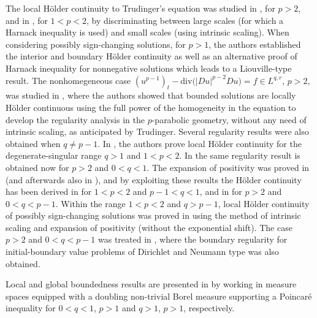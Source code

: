 \documentclass[a4paper,11pt,fullpage]{article}
\numberwithin{equation}{section}
\begin{document}
\noindent The local H\"older continuity to Trudinger's equation was studied in \cite{KuusSiljUrba10}, for $p>2$, and in \cite{KLSU}, for $1<p<2$, by discriminating between large scales (for which a Harnack inequality is used) and small scales (using intrinsic scaling). When considering possibly sign-changing solutions, for $p>1$, the authors \cite{BDL21} established the interior and boundary H\"older continuity as well as an alternative proof of Harnack inequality for nonnegative solutions which leads to a Liouville-type result. The nonhomegeneous case $\displaystyle{(u^{p-1})_t-\textrm{div} \big(|Du|^{p-2} Du\big)=f \in L^{q,r}}$, $p>2$, was studied in \cite{NU20}, where the authors showed that bounded solutions are locally H\"older continuous using the full power of the homogeneity in the equation to develop the regularity analysis in the $p$-parabolic geometry, without any need of intrinsic scaling, as anticipated by Trudinger. Several regularity results were also obtained when $q\neq p-1$. In \cite{HenrLal13}, the authors prove local H\"older continuity for the degenerate-singular range $q>1$ and $1<p<2$. In \cite{EH20} the same regularity result is obtained now for $p>2$ and $0<q<1$. The expansion of positivity was proved in \cite{EH21} (and afterwards also in \cite{M23}), and by exploiting these results the H\"older continuity has been derived in \cite{EH23} for $1<p<2$ and $p-1<q<1$, and in \cite{CH25} for $p>2$ and $0<q<p-1$. Within the range $1<p<2$ and $q>p-1$, local H\"older continuity of possibly sign-changing solutions was proved in \cite{NaS22} using  the method of intrinsic scaling and expansion of positivity (without the exponential shift). The case $p>2$ and $0<q<p-1$ was treated in \cite{BDLS23}, where the boundary regularity for initial-boundary value problems of Dirichlet and Neumann type was also  obtained. 

\noindent Local and global boundedness results are presented in \cite{HL16, HL18} by working in measure spaces equipped with a doubling non-trivial Borel measure supporting a Poincar\'e inequality for $0<q<1$, $p>1$ and $q>1$, $p>1$, respectively. 
\end{document}
